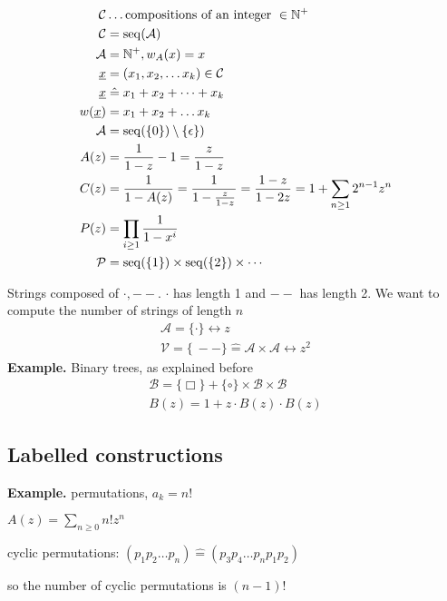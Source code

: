 \begin{align*}
    \mathcal{C} &\ldots \text{compositions of an integer }\in \mathbb{N}^{+} \\
    \mathcal{C} &= \operatorname{seq}(\mathcal{A}) \\
     \mathcal{A} &= \mathbb{N}^{+}, w_A(x) = x\\
	\underline{x} &= (x_1, x_2, \ldots x_k) \in \mathcal{C}\\
    \underline{x} &\mathrel{\hat{=}} x_1 + x_2 + \cdots + x_k\\
    w(\underline{x}) &= x_1 + x_2 + \ldots x_k\\
    \mathcal{A}&=\operatorname{seq}( \{ 0 \})\setminus \{\epsilon\}) \\
    A(z) &= \frac{1}{1-z} - 1 = \frac{z}{1-z} \\
    C(z) &= \frac{1}{1-A(z)} = \frac{1}{1-\frac{z}{1-z} }
         = \frac{1-z}{1-2z} 
         = 1 + \sum_{n\geq 1} 2^{n-1} z^n \\
    P(z) &= \prod_{i\geq 1} \frac{1}{1-x^i}\\
	\mathcal{P} &= \operatorname{seq}(\{1\}) \times \operatorname{seq}(\{2\}) \times \cdots \\
\end{align*}	 

Strings composed of $\cdot, --$. 
$\cdot$ has length 1 and $--$ has length 2.
We want to compute the number of strings of length $n$
\begin{align*}
    \mathcal{A} = \{\cdot\} \leftrightarrow z\\
    \mathcal{V} = \{\ -- \} \mathrel{\hat{=}} \mathcal{A} \times \mathcal{A} \leftrightarrow z^2 
\end{align*}
\textbf{Example.}
Binary trees, as explained before
\begin{align*}
    \mathcal{B} = \{ \Box\} + \{ \circ\} \times \mathcal{B} \times \mathcal{B}\\
    B(z) = 1 + z \cdot B(z) \cdot B(z)
\end{align*}

\subsection{Labelled constructions}
\textbf{Example.}
permutations, $a_k = n!$

$A(z) = \sum_{n\geq 0} n! z^n$

cyclic permutations: $(p_1 p_2 \ldots p_n) \mathrel{\hat{=}} (p_3 p_4 \ldots p_n p_1 p_2)$

so the number of cyclic permutations is $(n-1)!$

